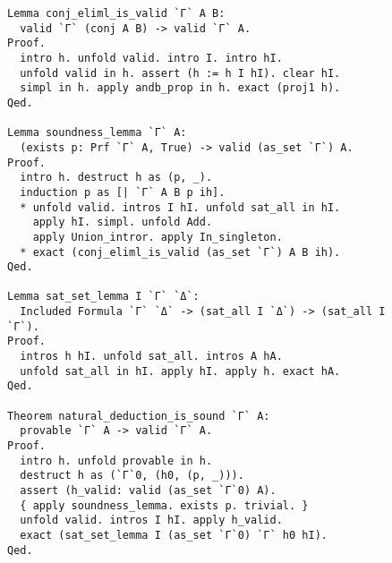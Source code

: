 \begin{figure}
\begin{lstlisting}[language=Coq, xleftmargin=\mathindent, escapechar=`,
label=lst:Korrektheit-KdnS, caption={Korrektheit des natürliches Schließens}]
Lemma conj_eliml_is_valid `Γ` A B:
  valid `Γ` (conj A B) -> valid `Γ` A.
Proof.
  intro h. unfold valid. intro I. intro hI.
  unfold valid in h. assert (h := h I hI). clear hI.
  simpl in h. apply andb_prop in h. exact (proj1 h).
Qed.

Lemma soundness_lemma `Γ` A:
  (exists p: Prf `Γ` A, True) -> valid (as_set `Γ`) A.
Proof.
  intro h. destruct h as (p, _).
  induction p as [| `Γ` A B p ih].
  * unfold valid. intros I hI. unfold sat_all in hI.
    apply hI. simpl. unfold Add.
    apply Union_intror. apply In_singleton.
  * exact (conj_eliml_is_valid (as_set `Γ`) A B ih).
Qed.

Lemma sat_set_lemma I `Γ` `Δ`:
  Included Formula `Γ` `Δ` -> (sat_all I `Δ`) -> (sat_all I `Γ`).
Proof.
  intros h hI. unfold sat_all. intros A hA.
  unfold sat_all in hI. apply hI. apply h. exact hA.
Qed.

Theorem natural_deduction_is_sound `Γ` A:
  provable `Γ` A -> valid `Γ` A.
Proof.
  intro h. unfold provable in h.
  destruct h as (`Γ`0, (h0, (p, _))).
  assert (h_valid: valid (as_set `Γ`0) A).
  { apply soundness_lemma. exists p. trivial. }
  unfold valid. intros I hI. apply h_valid.
  exact (sat_set_lemma I (as_set `Γ`0) `Γ` h0 hI).
Qed.
\end{lstlisting}
\end{figure}
